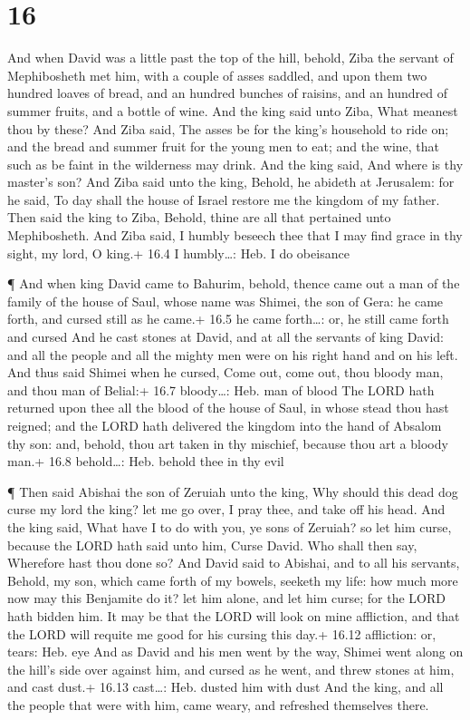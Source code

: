 \hypertarget{section-15}{%
\section{16}\label{section-15}}

 And when David was a little past the top of the hill,
behold, Ziba the servant of Mephibosheth met him, with a couple of asses
saddled, and upon them two hundred loaves of bread, and an hundred
bunches of raisins, and an hundred of summer fruits, and a bottle of
wine.  And the king said unto Ziba, What meanest thou by
these? And Ziba said, The asses be for the king's household to ride on;
and the bread and summer fruit for the young men to eat; and the wine,
that such as be faint in the wilderness may drink.  And the
king said, And where is thy master's son? And Ziba said unto the king,
Behold, he abideth at Jerusalem: for he said, To day shall the house of
Israel restore me the kingdom of my father.  Then said the
king to Ziba, Behold, thine are all that pertained unto Mephibosheth.
And Ziba said, I humbly beseech thee that I may find grace in thy sight,
my lord, O king.+ 16.4 I humbly\ldots: Heb. I do obeisance

 ¶ And when king David came to Bahurim, behold, thence came
out a man of the family of the house of Saul, whose name was Shimei, the
son of Gera: he came forth, and cursed still as he came.+ 16.5 he came
forth\ldots: or, he still came forth and cursed  And he cast
stones at David, and at all the servants of king David: and all the
people and all the mighty men were on his right hand and on his left.
 And thus said Shimei when he cursed, Come out, come out,
thou bloody man, and thou man of Belial:+ 16.7 bloody\ldots: Heb. man of
blood  The LORD hath returned upon thee all the blood of the
house of Saul, in whose stead thou hast reigned; and the LORD hath
delivered the kingdom into the hand of Absalom thy son: and, behold,
thou art taken in thy mischief, because thou art a bloody man.+ 16.8
behold\ldots: Heb. behold thee in thy evil

 ¶ Then said Abishai the son of Zeruiah unto the king, Why
should this dead dog curse my lord the king? let me go over, I pray
thee, and take off his head.  And the king said, What have
I to do with you, ye sons of Zeruiah? so let him curse, because the LORD
hath said unto him, Curse David. Who shall then say, Wherefore hast thou
done so?  And David said to Abishai, and to all his
servants, Behold, my son, which came forth of my bowels, seeketh my
life: how much more now may this Benjamite do it? let him alone, and let
him curse; for the LORD hath bidden him.  It may be that
the LORD will look on mine affliction, and that the LORD will requite me
good for his cursing this day.+ 16.12 affliction: or, tears: Heb. eye
 And as David and his men went by the way, Shimei went
along on the hill's side over against him, and cursed as he went, and
threw stones at him, and cast dust.+ 16.13 cast\ldots: Heb. dusted him
with dust  And the king, and all the people that were with
him, came weary, and refreshed themselves there.

